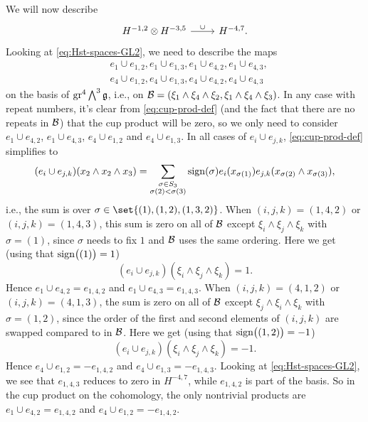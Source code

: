 We will now describe
\[
  \begin{tikzcd}
    H^{-1,2} \otimes H^{-3,5} \ar[r,"\cup"] & H^{-4,7}.
  \end{tikzcd}
\]
Looking at \eqref{eq:Hst-spaces-GL2}, we need to describe the maps
\begin{align*}
  &e_{1} \cup e_{1,2}, e_{1} \cup e_{1,3}, e_{1} \cup e_{4,2}, e_{1} \cup e_{4,3}, \\
  &e_{4} \cup e_{1,2}, e_{4} \cup e_{1,3}, e_{4} \cup e_{4,2}, e_{4} \cup e_{4,3}
\end{align*}
on the basis of $\operatorname{gr}^{4} \bigwedge^{3}\mathfrak{g}$, i.e., on $\mathcal{B} = (\xi_{1} \wedge \xi_{4} \wedge \xi_{2}, \xi_{1} \wedge \xi_{4} \wedge \xi_{3})$. In any case with repeat numbers, it's clear from \eqref{eq:cup-prod-def} (and the fact that there are no repeats in $\mathcal{B}$) that the cup product will be zero, so we only need to consider $e_{1} \cup e_{4,2}$, $e_{1} \cup e_{4,3}$, $e_{4} \cup e_{1,2}$ and $e_{4} \cup e_{1,3}$. In all cases of $e_{i} \cup e_{j,k}$, \eqref{eq:cup-prod-def} simplifies to
\begin{equation*}
  (e_{i} \cup e_{j,k})(x_{2} \wedge x_{2} \wedge x_{3}) = \sum_{\substack{\sigma \in S_{3} \\ \sigma(2) < \sigma(3)}} \operatorname{sign}(\sigma) e_{i}(x_{\sigma(1)}) e_{j,k}(x_{\sigma(2)} \wedge x_{\sigma(3)}),
\end{equation*}
i.e., the sum is over $\sigma \in \set{(1), (1,2), (1,3,2)}$. When $(i,j,k) = (1,4,2)$ or $(i,j,k) = (1,4,3)$, this sum is zero on all of $\mathcal{B}$ except $\xi_{i} \wedge \xi_{j} \wedge \xi_{k}$ with $\sigma=(1)$, since $\sigma$ needs to fix $1$ and $\mathcal{B}$ uses the same ordering. Here we get (using that $\operatorname{sign}\bigl((1)\bigr) = 1$)
\begin{equation*}
  (e_{i} \cup e_{j,k})(\xi_{i} \wedge \xi_{j} \wedge \xi_{k}) = 1.
\end{equation*}
Hence $e_{1} \cup e_{4,2} = e_{1,4,2}$ and $e_{1} \cup e_{4,3} = e_{1,4,3}$. When $(i,j,k) = (4,1,2)$ or $(i,j,k) = (4,1,3)$, the sum is zero on all of $\mathcal{B}$ except $\xi_{j} \wedge \xi_{i} \wedge \xi_{k}$ with $\sigma=(1,2)$, since the order of the first and second elements of $(i,j,k)$ are swapped compared to in $\mathcal{B}$. Here we get (using that $\operatorname{sign}\bigl((1,2)\bigr) = -1$)
\begin{equation*}
  (e_{i} \cup e_{j,k})(\xi_{i} \wedge \xi_{j} \wedge \xi_{k}) = -1.
\end{equation*}
Hence $e_{4} \cup e_{1,2} = -e_{1,4,2}$ and $e_{4} \cup e_{1,3} = -e_{1,4,3}$. Looking at \eqref{eq:Hst-spaces-GL2}, we see that $e_{1,4,3}$ reduces to zero in $H^{-4,7}$, while $e_{1,4,2}$ is part of the basis. So in the cup product on the cohomology, the only nontrivial products are $e_{1} \cup e_{4,2} = e_{1,4,2}$ and $e_{4} \cup e_{1,2} = -e_{1,4,2}$.


